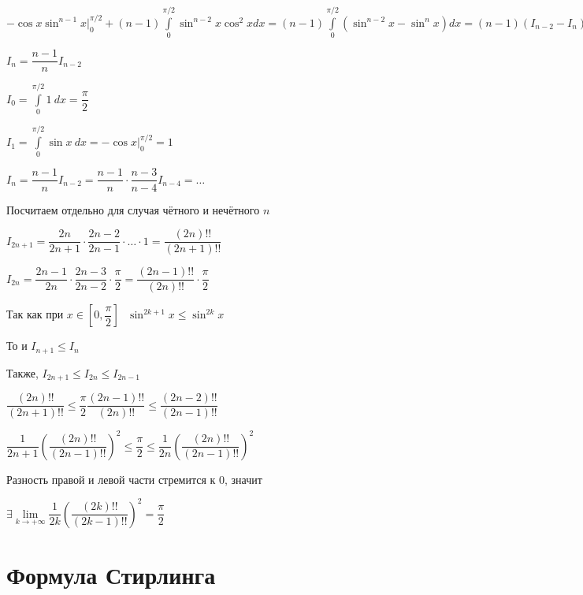 \documentclass{article}
\begin{document}
            $-\cos{x} \sin^{n - 1} x \bigg|^{\pi / 2}_0 + (n - 1) \int\limits^{\pi / 2}_0 \sin^{n - 2} x \cos^2 x dx = (n - 1) \int\limits^{\pi/2}_0 (\sin^{n - 2} x - \sin^n x) dx = (n - 1) (I_{n - 2} - I_n)$
            
            $I_n = \dfrac{n - 1}{n} I_{n - 2}$
            
            $I_0 = \int\limits^{\pi / 2}_0 1 \ dx = \dfrac{\pi}{2}$
            
            $I_1 = \int\limits^{\pi / 2}_0 \sin x \ dx = -\cos{x} \bigg|^{\pi / 2}_0 = 1$
            
            $I_n = \dfrac{n - 1}{n} I_{n - 2} = \dfrac{n - 1}{n} \cdot \dfrac{n - 3}{n - 4} I_{n - 4} = \ldots$
            
            Посчитаем отдельно для случая чётного и нечётного $n$
            
            $I_{2n + 1} = \dfrac{2n}{2n + 1} \cdot \dfrac{2n - 2}{2n - 1} \cdot \ldots \cdot 1 = \dfrac{(2n)!!}{(2n + 1)!!}$
            
            $I_{2n} = \dfrac{2n - 1}{2n} \cdot \dfrac{2n - 3}{2n - 2} \cdot \dfrac{\pi}{2} = \dfrac{(2n - 1)!!}{(2n)!!} \cdot \dfrac{\pi}{2}$
            
            Так как при $x \in \left[ 0, \dfrac{\pi}{2} \right] \ \ \ \sin^{2k + 1} x \leq \sin^{2k} x$
            
            То и $I_{n + 1} \leq I_n$
            
            Также, $I_{2n + 1} \leq I_{2n} \leq I_{2n - 1}$
            
            $\dfrac{(2n)!!}{(2n + 1)!!} \leq \dfrac{\pi}{2} \dfrac{(2n - 1)!!}{(2n)!!} \leq \dfrac{(2n - 2)!!}{(2n - 1)!!}$
            
            $\dfrac{1}{2n + 1} \left( \dfrac{(2n)!!}{(2n - 1)!!} \right)^2 \leq \dfrac{\pi}{2} \leq \dfrac{1}{2n} \left( \dfrac{(2n)!!}{(2n - 1)!!} \right)^2$
            
            Разность правой и левой части стремится к $0$, значит 
            
            $\exists \lim\limits_{k \rightarrow +\infty} \dfrac{1}{2k} \left( \dfrac{(2k)!!}{(2k - 1)!!} \right)^2 = \dfrac{\pi}{2}$
            
    \newpage
    
    \section{Формула Стирлинга}
    
\end{document}
